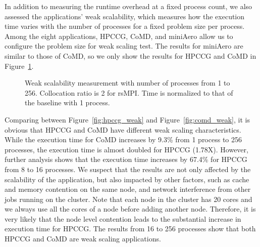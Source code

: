 In addition to measuring the runtime overhead at a fixed process count, we also assessed the applications' weak scalability, which measures how the execution time varies with the number of processes for a fixed problem size per process.
Among the eight applications, HPCCG, CoMD, and miniAero allow us to configure the problem size for weak scaling test. The results for miniAero are similar to those of CoMD, so we only show the results for HPCCG and CoMD in Figure~\ref{fig:scalability}. 


\begin{figure}[!t]
	\begin{center}
	\end{center}
	\caption{Weak scalability measurement with number of processes from 1 to 256. Collocation ratio is 2 for rsMPI. Time is normalized to that of the baseline with 1 process.}
	\label{fig:scalability}
\end{figure}

Comparing between Figure~\ref{fig:hpccg_weak} and Figure~\ref{fig:comd_weak}, it is obvious that HPCCG and CoMD have different weak scaling characteristics. While the execution time for CoMD increases by 9.3\% from 1 process to 256 processes, the execution time is almost doubled for HPCCG (1.78X). However, further analysis shows that the execution time increases by 67.4\% for HPCCG from 8 to 16 processes. We suspect that the results are not only affected by the scalability of the application, but also impacted by other factors, such as cache and memory contention on the same node, and network interference from other jobs running on the cluster. Note that each node in the cluster has 20 cores and we always use all the cores of a node before adding another node. Therefore, it is very likely that the node level contention leads to the substantial increase in execution time for HPCCG. The results from 16 to 256 processes show that both HPCCG and CoMD are weak scaling applications. 

